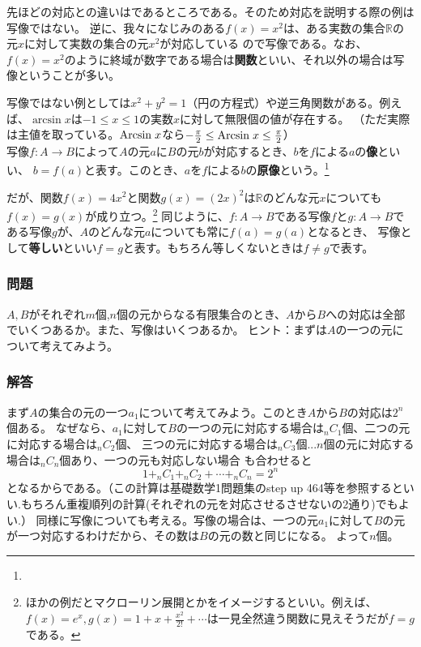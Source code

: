 \documentclass[a4j,dvipdfmx]{jsarticle}
\begin{document}
先ほどの対応との違いはであるところである。そのため対応を説明する際の例は写像ではない。
逆に、我々になじみのある$f(x)=x^2$は、ある実数の集合$\mathbb{R}$の元$x$に対して実数の集合の元$x^2$が対応している
ので写像である。なお、$f(x)=x^2$のように終域が数字である場合は\textbf{関数}といい、それ以外の場合は写像ということが多い。

写像ではない例としては$x^2+y^2=1$（円の方程式）や逆三角関数がある。例えば、$\arcsin x$は$-1\leq x\leq 1$の実数$x$に対して無限個の値が存在する。
（ただ実際は主値を取っている。$\mathrm{Arcsin}\hspace{1mm}x$なら$-\frac{\pi}{2}\leq \mathrm{Arcsin}\hspace{1mm}x\leq \frac{\pi}{2}$）\\

写像$f:A\to B$によって$A$の元$a$に$B$の元$b$が対応するとき、$b$を$f$による$a$の\textbf{像}といい、
$b=f(a)$と表す。このとき、$a$を$f$による$b$の\textbf{原像}という。\footnote{}

だが、関数$f(x)=4x^2$と関数$g(x)=(2x)^2$は$\mathbb{R}$のどんな元$x$についても$f(x)=g(x)$が成り立つ。\footnote{ほかの例だとマクローリン展開とかをイメージするといい。例えば、$f(x)=e^x,g(x)=1+x+\frac{x^2}{2!}+\cdots$は一見全然違う関数に見えそうだが$f=g$である。}
同じように、$f:A\to B$である写像$f$と$g:A\to B$である写像$g$が、$A$のどんな元$a$についても常に$f(a)=g(a)$となるとき、
写像として\textbf{等しい}といい$f=g$と表す。もちろん等しくないときは$f\neq g$で表す。

\subsubsection*{問題}
$A,B$がそれぞれ$m$個,$n$個の元からなる有限集合のとき、$A$から$B$への対応は全部でいくつあるか。また、写像はいくつあるか。
{\scriptsize ヒント：まずは$A$の一つの元について考えてみよう。}
\vspace{55mm}
\subsubsection*{解答}
\color{red}
まず$A$の集合の元の一つ$a_1$について考えてみよう。このとき$A$から$B$の対応は$2^n$個ある。
なぜなら、$a_1$に対して$B$の一つの元に対応する場合は$_nC_1$個、二つの元に対応する場合は$_nC_2$個、
三つの元に対応する場合は$_nC_3$個...$n$個の元に対応する場合は$_nC_n$個あり、一つの元も対応しない場合
も合わせると
\begin{equation*}
    1+_nC_1+_nC_2+\cdots+_nC_n=2^n
\end{equation*}
となるからである。（この計算は基礎数学1問題集のstep up 464等を参照するといい.もちろん重複順列の計算(それぞれの元を対応させるさせないの2通り)でもよい.）
同様に写像についても考える。写像の場合は、一つの元$a_1$に対して$B$の元が一つ対応するわけだから、その数は$B$の元の数と同じになる。
よって$n$個。
\end{document}
